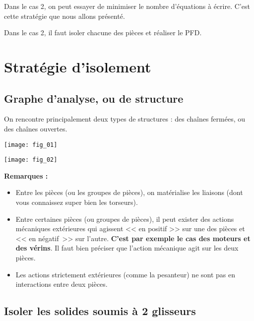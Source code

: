 Dans le cas 2, on peut essayer de minimiser le nombre d'équations à écrire. C'est cette stratégie que nous allons présenté.

Dans le cas 2, il faut isoler chacune des pièces et réaliser le PFD. 




\section{Stratégie d'isolement}

\subsection{Graphe d'analyse, ou de structure}

On rencontre principalement deux types de structures : des chaînes fermées, ou des chaînes ouvertes.

\begin{figure*}[!ht]
\begin{minipage}[c]{.4\linewidth}
\begin{center}
\texttt{[image: fig\_01]}
\end{center}
\end{minipage}
\hfill
\begin{minipage}[c]{.55\linewidth}
\begin{center}
\texttt{[image: fig\_02]}
\end{center}
\end{minipage}
\end{figure*}

\textbf{Remarques :}
\begin{itemize}
\item Entre les pièces (ou les groupes de pièces), on matérialise les liaisons (dont vous connaissez super bien les torseurs).
\item Entre certaines pièces (ou groupes de pièces), il peut exister des actions mécaniques extérieures qui agissent << en positif >> sur une des pièces et << en négatif~>> sur l'autre. \textbf{C'est par exemple le cas des moteurs et des vérins}. Il faut bien préciser que l'action mécanique agit sur les deux pièces.
\item Les actions strictement extérieures (comme la pesanteur) ne sont pas en interactions entre deux pièces.
\end{itemize}


\subsection{Isoler les solides soumis à 2 glisseurs}

